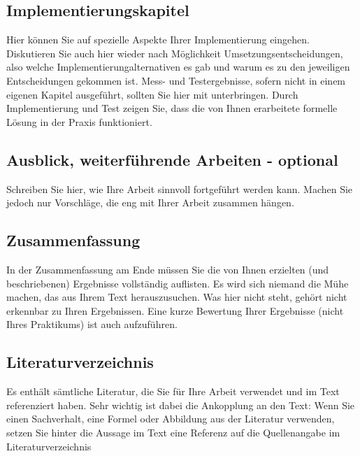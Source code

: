 \subsection{Implementierungskapitel}
Hier können Sie auf spezielle Aspekte Ihrer Implementierung eingehen.
Diskutieren Sie auch hier wieder nach Möglichkeit Umsetzungsentscheidungen,
also welche Implementierungalternativen es gab und warum es zu den jeweiligen Entscheidungen
gekommen ist. Mess- und Testergebnisse, sofern
nicht in einem eigenen Kapitel ausgeführt, sollten Sie hier mit unterbringen.
Durch Implementierung und Test zeigen Sie, dass die von Ihnen erarbeitete
formelle Lösung in der Praxis funktioniert.


\subsection{Ausblick, weiterführende Arbeiten - optional}
Schreiben Sie hier, wie Ihre Arbeit sinnvoll fortgeführt werden kann. Machen
Sie jedoch nur Vorschläge, die eng mit Ihrer Arbeit zusammen hängen.


\subsection{Zusammenfassung}
In der Zusammenfassung am Ende müssen Sie die von Ihnen erzielten (und
beschriebenen) Ergebnisse vollständig auflisten. Es wird sich niemand die
Mühe machen, das aus Ihrem Text herauszusuchen. Was hier nicht steht,
gehört nicht erkennbar zu Ihren Ergebnissen. Eine kurze Bewertung Ihrer
Ergebnisse (nicht Ihres Praktikums) ist auch aufzuführen.


\subsection{Literaturverzeichnis}
Es enthält sämtliche Literatur, die Sie für Ihre Arbeit verwendet und im
Text referenziert haben. Sehr wichtig ist dabei die Ankopplung an den Text:
Wenn Sie einen Sachverhalt, eine Formel oder Abbildung aus der Literatur
verwenden, setzen Sie hinter die Aussage im Text eine Referenz auf die
Quellenangabe im Literaturverzeichnis